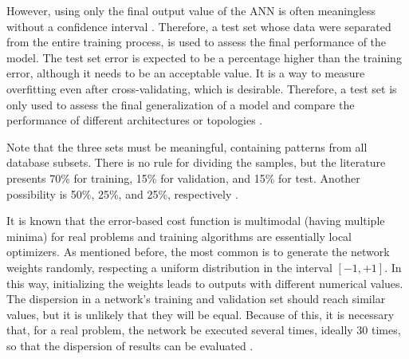 
However, using only the final output value of the ANN is often meaningless without a confidence interval \cite{Kohavi1995}. Therefore, a test set whose data were separated from the entire training process, is used to assess the final performance of the model. The test set error is expected to be a percentage higher than the training error, although it needs to be an acceptable value. It is a way to measure overfitting even after cross-validating, which is desirable. Therefore, a test set is only used to assess the final generalization of a model and compare the performance of different architectures or topologies \cite{Ripley2005}.


Note that the three sets must be meaningful, containing patterns from all database subsets. There is no rule for dividing the samples, but the literature presents 70\% for training, 15\% for validation, and 15\% for test. Another possibility is 50\%, 25\%, and 25\%, respectively \cite{haykin}.

It is known that the error-based cost function is multimodal (having multiple minima) for real problems and training algorithms are essentially local optimizers. As mentioned before, the most common is to generate the network weights randomly, respecting a uniform distribution in the interval $[-1,+1]$. In this way, initializing the weights leads to outputs with different numerical values. The dispersion in a network's training and validation set should reach similar values, but it is unlikely that they will be equal. Because of this, it is necessary that, for a real problem, the network %
be executed several times, ideally 30 times, so that the dispersion of results can be evaluated \cite{demvsar2006statistical}. 

